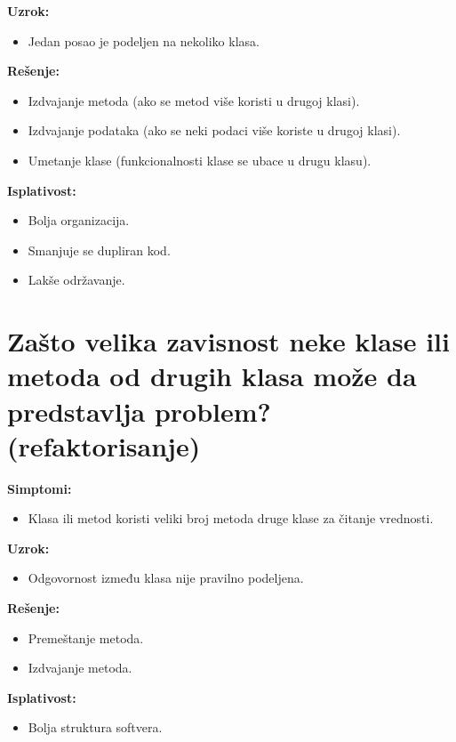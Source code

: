 \documentclass[a4paper]{article}
\begin{document}
  \noindent \textbf{Uzrok:} 
  \begin{itemize}
    \item Jedan posao je podeljen na nekoliko klasa. 
  \end{itemize}

  \noindent \textbf{Rešenje:} 
  \begin{itemize}
    \item Izdvajanje metoda (ako se metod više koristi u drugoj klasi).
    \item Izdvajanje podataka (ako se neki podaci više koriste u drugoj klasi).
    \item Umetanje klase (funkcionalnosti klase se ubace u drugu klasu).
  \end{itemize}

  \noindent \textbf{Isplativost:} 
  \begin{itemize}
    \item Bolja organizacija.
    \item Smanjuje se dupliran kod.
    \item Lakše održavanje.
  \end{itemize}

\section{Zašto velika zavisnost neke klase ili metoda od drugih klasa može da 
         predstavlja problem? (refaktorisanje)}
  \noindent \textbf{Simptomi:}
  \begin{itemize}
    \item Klasa ili metod koristi veliki broj metoda druge klase za čitanje vrednosti.
  \end{itemize}

  \noindent \textbf{Uzrok:} 
  \begin{itemize}
    \item Odgovornost između klasa nije pravilno podeljena.
  \end{itemize}

  \noindent \textbf{Rešenje:} 
  \begin{itemize}
    \item Premeštanje metoda.
    \item Izdvajanje metoda.
  \end{itemize}

  \noindent \textbf{Isplativost:} 
  \begin{itemize}
    \item Bolja struktura softvera.
  \end{itemize}
\end{document}
